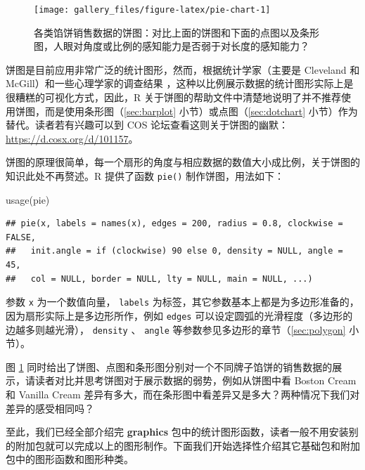 \documentclass[
  b5paper,
  UTF8,twoside]{book}
\newenvironment{Shaded}{\begin{snugshade}}{\end{snugshade}}
\newcommand{\FunctionTok}[1]{\textcolor[rgb]{0.00,0.00,0.00}{#1}}
\newcommand{\NormalTok}[1]{#1}
\begin{document}
\begin{figure}

{\centering \texttt{[image: gallery\_files/figure-latex/pie-chart-1]} 

}

\caption[各类馅饼销售数据的饼图]{各类馅饼销售数据的饼图：对比上面的饼图和下面的点图以及条形图，人眼对角度或比例的感知能力是否弱于对长度的感知能力？}\label{fig:pie-chart}
\end{figure}

饼图是目前应用非常广泛的统计图形，然而，根据统计学家（主要是 Cleveland 和 McGill）和一些心理学家的调查结果 \citep{Cleveland85}，这种以比例展示数据的统计图形实际上是很糟糕的可视化方式，因此，R 关于饼图的帮助文件中清楚地说明了并不推荐使用饼图，而是使用条形图（\ref{sec:barplot} 小节）或点图（\ref{sec:dotchart} 小节）作为替代。读者若有兴趣可以到 COS 论坛查看这则关于饼图的幽默：\url{https://d.cosx.org/d/101157}。

饼图的原理很简单，每一个扇形的角度与相应数据的数值大小成比例，关于饼图的知识此处不再赘述。R 提供了函数 \texttt{pie()} 制作饼图，用法如下：

\begin{Shaded}
\begin{Highlighting}[]
\FunctionTok{usage}\NormalTok{(pie)}
\end{Highlighting}
\end{Shaded}

\begin{verbatim}
## pie(x, labels = names(x), edges = 200, radius = 0.8, clockwise = FALSE,
##   init.angle = if (clockwise) 90 else 0, density = NULL, angle = 45,
##   col = NULL, border = NULL, lty = NULL, main = NULL, ...)
\end{verbatim}

参数 \texttt{x} 为一个数值向量， \texttt{labels} 为标签，其它参数基本上都是为多边形准备的，因为扇形实际上是多边形所作，例如 \texttt{edges} 可以设定圆弧的光滑程度（多边形的边越多则越光滑）， \texttt{density} 、 \texttt{angle} 等参数参见多边形的章节（\ref{sec:polygon} 小节）。

图 \ref{fig:pie-chart} 同时给出了饼图、点图和条形图分别对一个不同牌子馅饼的销售数据的展示，请读者对比并思考饼图对于展示数据的弱势，例如从饼图中看 Boston Cream 和 Vanilla Cream 差异有多大，而在条形图中看差异又是多大？两种情况下我们对差异的感受相同吗？

至此，我们已经全部介绍完 \textbf{graphics} 包中的统计图形函数，读者一般不用安装别的附加包就可以完成以上的图形制作。下面我们开始选择性介绍其它基础包和附加包中的图形函数和图形种类。
\end{document}

